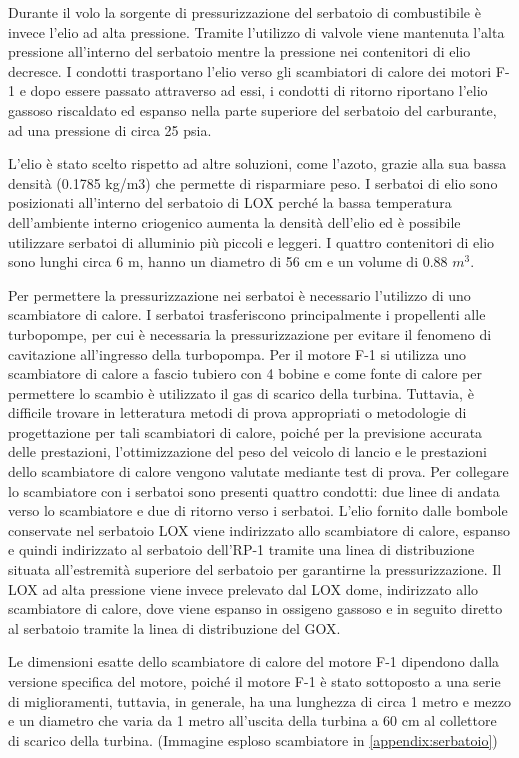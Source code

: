 Durante il volo la sorgente di pressurizzazione del serbatoio di combustibile è invece l’elio ad alta pressione. Tramite l’utilizzo di valvole viene mantenuta l’alta pressione all’interno del serbatoio mentre la pressione nei contenitori di elio decresce. 
I condotti trasportano l’elio verso gli scambiatori di calore dei motori F-1 e dopo essere passato attraverso ad essi, i condotti di ritorno riportano l’elio gassoso riscaldato ed espanso nella parte superiore del serbatoio del carburante, ad una pressione di circa 25 psia.

L’elio è stato scelto rispetto ad altre soluzioni, come l’azoto, grazie alla sua bassa densità (0.1785 kg/m3) che permette di risparmiare peso.
I serbatoi di elio sono posizionati all’interno del serbatoio di LOX perché la bassa temperatura dell’ambiente interno criogenico aumenta la densità dell’elio ed è possibile utilizzare serbatoi di alluminio più piccoli e leggeri.
I quattro contenitori di elio sono lunghi circa 6 m, hanno un diametro di 56 cm e un volume di 0.88 $m^3$.

Per permettere la pressurizzazione nei serbatoi è necessario l’utilizzo di uno scambiatore di calore.
I serbatoi trasferiscono principalmente i propellenti alle turbopompe, per cui è necessaria la pressurizzazione per evitare il fenomeno di cavitazione all'ingresso della turbopompa. 
Per il motore F-1 si utilizza uno scambiatore di calore a fascio tubiero con 4 bobine e come fonte di calore per permettere lo scambio è utilizzato il gas di scarico della turbina.
Tuttavia, è difficile trovare in letteratura metodi di prova appropriati o metodologie di progettazione per tali scambiatori di calore, poiché per la previsione accurata delle prestazioni, l'ottimizzazione del peso del veicolo di lancio e le prestazioni dello scambiatore di calore vengono valutate mediante test di prova. 
Per collegare lo scambiatore con i serbatoi sono presenti quattro condotti: due linee di andata verso lo scambiatore e due di ritorno verso i serbatoi.
L'elio fornito dalle bombole conservate nel serbatoio LOX viene indirizzato allo scambiatore di calore, espanso e quindi indirizzato al serbatoio dell’RP-1 tramite una linea di distribuzione situata all'estremità superiore del serbatoio per garantirne la pressurizzazione. 
Il LOX ad alta pressione viene invece prelevato dal LOX dome, indirizzato allo scambiatore di calore, dove viene espanso in ossigeno gassoso e in seguito diretto al serbatoio tramite la linea di distribuzione del GOX.

Le dimensioni esatte dello scambiatore di calore del motore F-1 dipendono dalla versione specifica del motore, poiché il motore F-1 è stato sottoposto a una serie di miglioramenti, tuttavia, in generale, ha una lunghezza di circa 1 metro e mezzo e un diametro che varia da 1 metro all'uscita della turbina a 60 cm al collettore di scarico della turbina. (Immagine esploso scambiatore in \autoref{appendix:serbatoio})